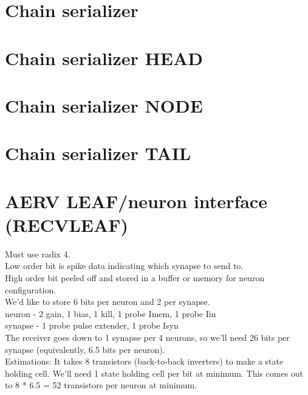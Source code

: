 \documentclass{article}
\begin{document}
\section{Chain serializer \label{sec:SERIAL_CHAIN}}

\section{Chain serializer HEAD \label{sec:SERIAL_CHAIN_HEAD}}

\section{Chain serializer NODE \label{sec:SERIAL_CHAIN_NODE}}

\section{Chain serializer TAIL \label{sec:SERIAL_CHAIN_TAIL}}

\section{AERV LEAF/neuron interface (RECVLEAF) \label{sec:RECV_LEAF}}

Must use radix 4. \\
Low order bit is spike data indicating which synapse to send to. \\
High order bit peeled off and stored in a buffer or memory for neuron configuration. \\

\noindent
We'd like to store 6 bits per neuron and 2 per synapse. \\
neuron - 2 gain, 1 bias, 1 kill, 1 probe Imem, 1 probe Iin \\
synapse - 1 probe pulse extender, 1 probe Isyn \\
The receiver goes down to 1 synapse per 4 neurons, so we'll need 26 bits per synapse (equivalently, 6.5 bits per neuron). \\

\noindent
Estimations: It takes 8 transistors (back-to-back inverters) to make a state holding cell. We'll need 1 state holding cell per bit at minimum. This comes out to 8 * 6.5 = 52 transistors per neuron at minimum.
\end{document}
